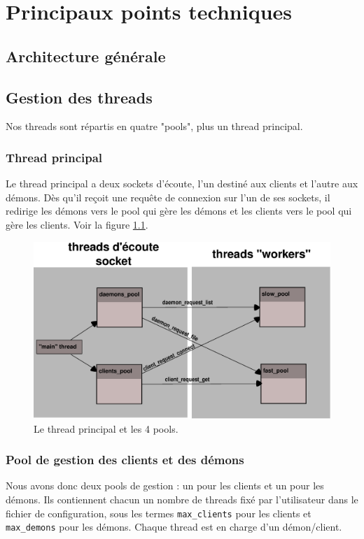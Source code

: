 \chapter{Principaux points techniques}


\section{Architecture générale}




\section{Gestion des threads}
\label{threads_by_pools}
Nos threads sont répartis en quatre "pools", plus un thread principal.


\subsection{Thread principal}
Le thread principal a deux sockets d'écoute, l'un destiné aux clients et
l'autre aux démons. Dès qu'il reçoit une requête de connexion sur l'un de
ses sockets, il redirige les démons vers le pool qui gère les démons et
les clients vers le pool qui gère les clients. Voir la figure \ref{interaction}.
\begin{center}
\begin{figure}[htbp]
    \centering
    \includegraphics[scale=0.4]{pools_interacting.eps}
    \caption{Le thread principal et les 4 pools.}
    \label{interaction}
\end{figure}
\end{center}


\subsection{Pool de gestion des clients et des démons}
Nous avons donc deux pools de gestion : un pour les clients et un pour
les démons. Ils contiennent chacun un nombre de threads fixé par
l'utilisateur dans le fichier de configuration, sous les termes 
\verb$max_clients$ pour les clients et \verb$max_demons$ pour les démons.
Chaque thread est en charge d'un démon/client.

